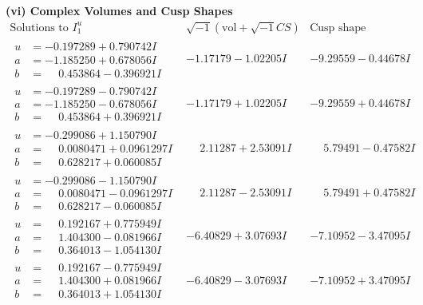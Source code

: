\documentclass[1p]{elsarticle_modified}
\theoremstyle{definition}
\newcommand{\I}{\sqrt{-1}}
\begin{document}
\newpage\flushleft \textbf{(vi) Complex Volumes and Cusp Shapes}
$$\begin{array}{c|c|c}  
\text{Solutions to }I^u_{1}& \I (\text{vol} + \sqrt{-1}CS) & \text{Cusp shape}\\
 \hline 
\begin{aligned}
u &= -0.197289 + 0.790742 I \\
a &= -1.185250 + 0.678056 I \\
b &= \phantom{-}0.453864 - 0.396921 I\end{aligned}
 & -1.17179 - 1.02205 I & -9.29559 - 0.44678 I \\ \hline\begin{aligned}
u &= -0.197289 - 0.790742 I \\
a &= -1.185250 - 0.678056 I \\
b &= \phantom{-}0.453864 + 0.396921 I\end{aligned}
 & -1.17179 + 1.02205 I & -9.29559 + 0.44678 I \\ \hline\begin{aligned}
u &= -0.299086 + 1.150790 I \\
a &= \phantom{-}0.0080471 + 0.0961297 I \\
b &= \phantom{-}0.628217 + 0.060085 I\end{aligned}
 & \phantom{-}2.11287 + 2.53091 I & \phantom{-}5.79491 - 0.47582 I \\ \hline\begin{aligned}
u &= -0.299086 - 1.150790 I \\
a &= \phantom{-}0.0080471 - 0.0961297 I \\
b &= \phantom{-}0.628217 - 0.060085 I\end{aligned}
 & \phantom{-}2.11287 - 2.53091 I & \phantom{-}5.79491 + 0.47582 I \\ \hline\begin{aligned}
u &= \phantom{-}0.192167 + 0.775949 I \\
a &= \phantom{-}1.404300 - 0.081966 I \\
b &= \phantom{-}0.364013 - 1.054130 I\end{aligned}
 & -6.40829 + 3.07693 I & -7.10952 - 3.47095 I \\ \hline\begin{aligned}
u &= \phantom{-}0.192167 - 0.775949 I \\
a &= \phantom{-}1.404300 + 0.081966 I \\
b &= \phantom{-}0.364013 + 1.054130 I\end{aligned}
 & -6.40829 - 3.07693 I & -7.10952 + 3.47095 I \\ \hline\begin{aligned}

\end{aligned}
\end{array}$$
\end{document}
